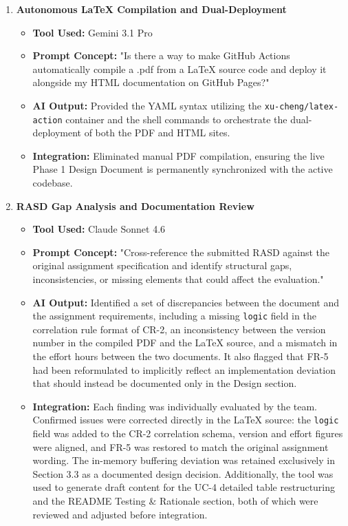 \documentclass[11pt, a4paper]{article}
\begin{document}
\begin{enumerate}[label=\textbf{Topic \arabic*:}, align=left, leftmargin=0.5cm]
    \item \textbf{Autonomous LaTeX Compilation and Dual-Deployment}
    \begin{itemize}[label={}, leftmargin=0.5cm]
        \item \textbf{Tool Used:} Gemini 3.1 Pro
        \item \textbf{Prompt Concept:} "Is there a way to make GitHub Actions automatically compile a .pdf from a LaTeX source code and deploy it alongside my HTML documentation on GitHub Pages?"
        \item \textbf{AI Output:} Provided the YAML syntax utilizing the \texttt{xu-cheng/latex-action} container and the shell commands to orchestrate the dual-deployment of both the PDF and HTML sites.
        \item \textbf{Integration:} Eliminated manual PDF compilation, ensuring the live Phase 1 Design Document is permanently synchronized with the active codebase.
    \end{itemize}

    \item \textbf{RASD Gap Analysis and Documentation Review}
    \begin{itemize}[label={}, leftmargin=0.5cm]
        \item \textbf{Tool Used:} Claude Sonnet 4.6
        \item \textbf{Prompt Concept:} "Cross-reference the submitted RASD against the original assignment specification and identify structural gaps, inconsistencies, or missing elements that could affect the evaluation."
        \item \textbf{AI Output:} Identified a set of discrepancies between the document and the assignment requirements, including a missing \texttt{logic} field in the correlation rule format of CR-2, an inconsistency between the version number in the compiled PDF and the LaTeX source, and a mismatch in the effort hours between the two documents. It also flagged that FR-5 had been reformulated to implicitly reflect an implementation deviation that should instead be documented only in the Design section.
        \item \textbf{Integration:} Each finding was individually evaluated by the team. Confirmed issues were corrected directly in the LaTeX source: the \texttt{logic} field was added to the CR-2 correlation schema, version and effort figures were aligned, and FR-5 was restored to match the original assignment wording. The in-memory buffering deviation was retained exclusively in Section 3.3 as a documented design decision. Additionally, the tool was used to generate draft content for the UC-4 detailed table restructuring and the README Testing \& Rationale section, both of which were reviewed and adjusted before integration.
    \end{itemize}
    \vspace{0.3cm}

\end{enumerate}
\end{document}
